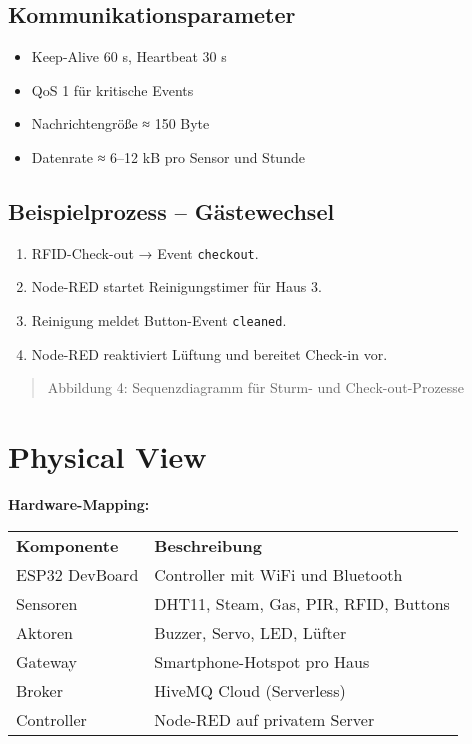 \documentclass[12pt,a4paper]{article}
\begin{document}
\subsection{Kommunikationsparameter}
\begin{itemize}[noitemsep]
  \item Keep-Alive 60 s, Heartbeat 30 s  
  \item QoS 1 für kritische Events  
  \item Nachrichtengröße ≈ 150 Byte  
  \item Datenrate ≈ 6–12 kB pro Sensor und Stunde
\end{itemize}

\subsection{Beispielprozess – Gästewechsel}
\begin{enumerate}[noitemsep]
  \item RFID-Check-out → Event \texttt{checkout}.
  \item Node-RED startet Reinigungstimer für Haus 3.
  \item Reinigung meldet Button-Event \texttt{cleaned}.
  \item Node-RED reaktiviert Lüftung und bereitet Check-in vor.
\end{enumerate}

\begin{quote}
Abbildung 4: Sequenzdiagramm für Sturm- und Check-out-Prozesse
\end{quote}

\newpage
\section{Physical View}
\textbf{Hardware-Mapping:}

\begin{tabular}{p{4cm}p{10cm}}
\textbf{Komponente} & \textbf{Beschreibung} \\
ESP32 DevBoard & Controller mit WiFi und Bluetooth \\
Sensoren & DHT11, Steam, Gas, PIR, RFID, Buttons \\
Aktoren & Buzzer, Servo, LED, Lüfter \\
Gateway & Smartphone-Hotspot pro Haus \\
Broker & HiveMQ Cloud (Serverless) \\
Controller & Node-RED auf privatem Server \\
\end{tabular}
\end{document}
